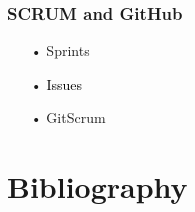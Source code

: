 \documentclass{beamer}
\begin{document}
\begin{frame}
    \frametitle{SCRUM and GitHub}
    \begin{itemize}
    \color{gray}
    \item[•] Sprints
    \item[•] \textcolor{black}{Issues}
    \item[•] GitScrum
    \end{itemize}
\end{frame}



\section{Bibliography}



\end{document}
